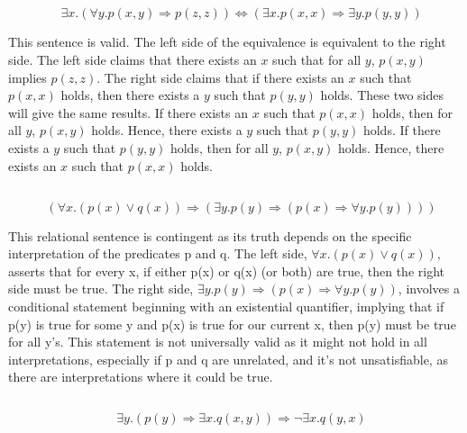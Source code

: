 \documentclass[12pt]{article}
\begin{document}
\subsection*{}

\[ \quad \exists x.\left(\forall y.p(x, y) \Rightarrow p(z, z)\right) \Leftrightarrow \left(\exists x.p(x, x) \Rightarrow \exists y.p(y, y)\right) \] 

This sentence is valid. The left side of the equivalence is equivalent to the right side. The left side claims that there exists an $x$ such that for all $y$, $p(x,y)$ implies $p(z,z)$. The right side claims that if there exists an $x$ such that $p(x,x)$ holds, then there exists a $y$ such that $p(y,y)$ holds. These two sides will give the same results. If there exists an $x$ such that $p(x,x)$ holds, then for all $y$, $p(x,y)$ holds. Hence, there exists a $y$ such that $p(y,y)$ holds. If there exists a $y$ such that $p(y,y)$ holds, then for all $y$, $p(x,y)$ holds. Hence, there exists an $x$ such that $p(x,x)$ holds.
\newpage

\subsection*{}

\[ \quad \left(\forall x.\left(p(x) \lor q(x)\right) \Rightarrow \left(\exists y.p(y) \Rightarrow \left(p(x) \Rightarrow \forall y.p(y)\right)\right)\right) \] 

This relational sentence is contingent as its truth depends on the specific interpretation of the predicates p and q. The left side, $\forall x.(p(x) \lor q(x))$, asserts that for every x, if either p(x) or q(x) (or both) are true, then the right side must be true. The right side, $\exists y.p(y) \Rightarrow (p(x) \Rightarrow \forall y.p(y))$, involves a conditional statement beginning with an existential quantifier, implying that if p(y) is true for some y and p(x) is true for our current x, then p(y) must be true for all y's. This statement is not universally valid as it might not hold in all interpretations, especially if p and q are unrelated, and it's not unsatisfiable, as there are interpretations where it could be true.

\subsection*{}

\[ \quad \exists y.\left(p(y) \Rightarrow \exists x.q(x, y)\right) \Rightarrow \neg \exists x.q(y, x) \] 
\end{document}
